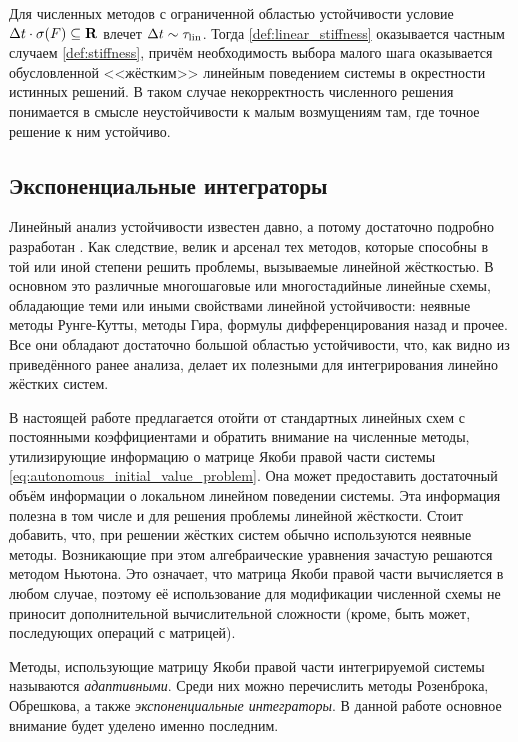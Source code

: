 Для численных методов с ограниченной областью устойчивости условие $ \Delta t \cdot \sigma(F) \subseteq \mathbf{R} $ влечет $ \Delta t \sim \tau_{\textnormal{lin}} $.
Тогда \ref{def:linear_stiffness} оказывается частным случаем \ref{def:stiffness},
причём необходимость выбора малого шага оказывается обусловленной <<жёстким>> линейным поведением системы в окрестности истинных решений.
В таком случае некорректность численного решения понимается в смысле неустойчивости к малым возмущениям там, где точное решение к ним устойчиво.


\subsection{Экспоненциальные интеграторы}
\label{subsec:exponential_integrators}

Линейный анализ устойчивости известен давно, а потому достаточно подробно разработан
\cite{auzinger1993modern, dahlquist1963special, dahlquist1975stability, liu2019study, heirer1999solvingode2, lambert1991methods}.
Как следствие, велик и арсенал тех методов, которые способны в той или иной степени решить проблемы, вызываемые линейной жёсткостью.
В основном это различные многошаговые или многостадийные линейные схемы, обладающие теми или иными свойствами линейной устойчивости:
неявные методы Рунге-Кутты, методы Гира, формулы дифференцирования назад и прочее.
Все они обладают достаточно большой областью устойчивости, что, как видно из приведённого ранее анализа,
делает их полезными для интегрирования линейно жёстких систем.

В настоящей работе предлагается отойти от стандартных линейных схем с постоянными коэффициентами и обратить внимание на численные методы,
утилизирующие информацию о матрице Якоби правой части системы \eqref{eq:autonomous_initial_value_problem}.
Она может предоставить достаточный объём информации о локальном линейном поведении системы.
Эта информация полезна в том числе и для решения проблемы линейной жёсткости.
Стоит добавить, что, при решении жёстких систем обычно используются неявные методы.
Возникающие при этом алгебраические уравнения зачастую решаются методом Ньютона.
Это означает, что матрица Якоби правой части вычисляется в любом случае,
поэтому её использование для модификации численной схемы не приносит дополнительной вычислительной сложности
(кроме, быть может, последующих операций с матрицей).

Методы, использующие матрицу Якоби правой части интегрируемой системы называются \emph{адаптивными}.
Среди них можно перечислить методы Розенброка, Обрешкова, а также \emph{экспоненциальные интеграторы}.
В данной работе основное внимание будет уделено именно последним.

